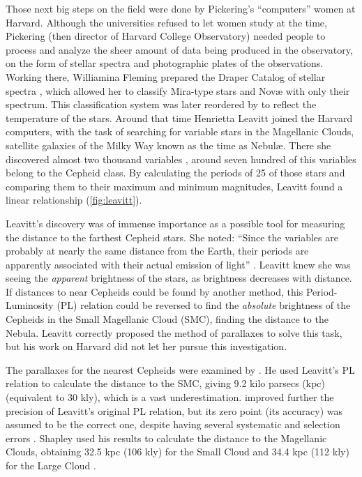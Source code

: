 Those next big steps on the field were done by Pickering's ``computers'' women at Harvard. 
Although the universities refused to let women study at the time, Pickering (then director of Harvard College Observatory) 
needed people to process and analyze the sheer amount of data being produced in the observatory, 
on the form of stellar spectra and photographic plates of the observations.
Working there, Williamina Fleming prepared the Draper Catalog of stellar spectra \citep{Pickering1890,Maury1897}, 
which allowed her to classify Mira-type stars and Nov\ae{} with only their spectrum. 
This classification system was later reordered by \cite{Canon1901} to reflect the temperature of the stars.
Around that time Henrietta Leavitt joined the Harvard computers, 
with the task of searching for variable stars in the Magellanic Clouds, satellite galaxies of the Milky Way known as the time as Nebul\ae{}.
There she discovered almost two thousand variables \citep{Leavitt1908}, around seven hundred of this variables belong to the Cepheid class. 
By calculating the periods of 25 of those stars and comparing them to their maximum and minimum magnitudes, Leavitt found a linear relationship (\autoref{fig:leavitt}).


Leavitt's discovery was of immense importance as a possible tool for measuring the distance to the farthest Cepheid stars. 
She noted: \enquote{Since the variables are probably at nearly the same distance from the Earth,
their periods are apparently associated with their actual emission of light} \citep[page 3]{Leavitt1912}.
Leavitt knew she was seeing the \textit{apparent} brightness of the stars, as brightness decreases with distance.
If distances to near Cepheids could be found by another method, 
this Period-Luminosity (PL) relation could be reversed to find the \textit{absolute} brightness of the Cepheids in the Small Magellanic Cloud (SMC),
finding the distance to the Nebula.
Leavitt correctly proposed the method of parallaxes to solve this task, but his work on Harvard did not let her pursue this investigation.


The parallaxes for the nearest Cepheids were examined by \cite{Hertzsprung1913}.
He used Leavitt's PL relation to calculate the distance to the SMC, 
giving \citep[after a \enquote{pen error}, see][]{Fernie1969} 9.2 kilo parsecs (kpc) (equivalent to 30 kly), which is a vast underestimation.
\cite{Shapley1918} improved further the precision of Leavitt's original PL relation, 
but its zero point (its accuracy) was assumed to be the correct one, despite having several systematic and selection errors \citep{Fernie1969}.
Shapley used his results to calculate the distance to the Magellanic Clouds, 
obtaining 32.5 kpc (106 kly) for the Small Cloud \citep{Shapley1924S} and 34.4 kpc (112 kly) for the Large Cloud \citep{Shapley1924L}.

